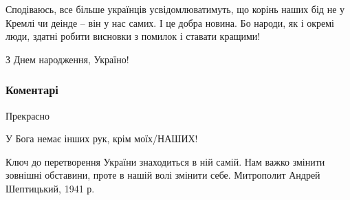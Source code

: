 Сподіваюсь, все більше українців усвідомлюватимуть, що корінь наших бід не у
Кремлі чи деінде – він у нас самих. І це добра новина. Бо народи, як і окремі
люди, здатні робити висновки з помилок і ставати кращими! 

З Днем народження, Україно!

\subsubsection{Коментарі}
\begin{itemize}
 
Прекрасно

 
У Бога немає інших рук, крім моїх/НАШИХ!🤝

 

Ключ до перетворення України знаходиться в ній самій. Нам важко змінити
зовнішні обставини, проте в нашій волі змінити себе. Митрополит Андрей
Шептицький, 1941 р.
\end{itemize}


